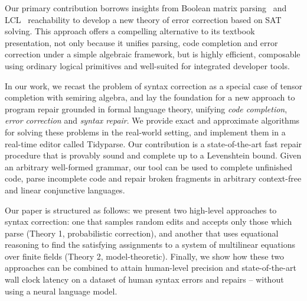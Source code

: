 \documentclass[sigplan,review,anonymous,acmsmall]{acmart}\settopmatter{printfolios=false,printccs=false,printacmref=false}
\begin{document}
Our primary contribution borrows insights from Boolean matrix parsing~\cite{valiant1975general} and LCL~\cite{zhang2017context} reachability to develop a new theory of error correction based on SAT solving. This approach offers a compelling alternative to its textbook presentation, not only because it unifies parsing, code completion and error correction under a simple algebraic framework, but is highly efficient, composable using ordinary logical primitives and well-suited for integrated developer tools.

In our work, we recast the problem of syntax correction as a special case of tensor completion with semiring algebra, and lay the foundation for a new approach to program repair grounded in formal language theory, unifying \textit{code completion}, \textit{error correction} and \textit{syntax repair}. We provide exact and approximate algorithms for solving these problems in the real-world setting, and implement them in a real-time editor called Tidyparse. Our contribution is a state-of-the-art fast repair procedure that is provably sound and complete up to a Levenshtein bound. Given an arbitrary well-formed grammar, our tool can be used to complete unfinished code, parse incomplete code and repair broken fragments in arbitrary context-free and linear conjunctive languages.

Our paper is structured as follows: we present two high-level approaches to syntax correction: one that samples random edits and accepts only those which parse (Theory 1, probabilistic correction), and another that uses equational reasoning to find the satisfying assignments to a system of multilinear equations over finite fields (Theory 2, model-theoretic). Finally, we show how these two approaches can be combined to attain human-level precision and state-of-the-art wall clock latency on a dataset of human syntax errors and repairs -- without using a neural language model.
\end{document}
